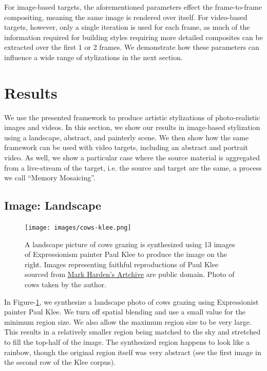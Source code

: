 \documentclass[a4paper,10pt,final]{ThesisStyle}
\begin{document}
For image-based targets, the aforementioned parameters effect the frame-to-frame compositing, meaning the same image is rendered over itself.  For video-based targets, however, only a single iteration is used for each frame, as much of the information required for building styles requiring more detailed composites can be extracted over the first 1 or 2 frames.  We demonstrate how these parameters can influence a wide range of stylizations in the next section.
\section{Results}  
\label{sec:results}
We use the presented framework to produce artistic stylizations of photo-realistic images and videos.  In this section, we show our results in image-based stylization using a landscape, abstract, and painterly scene. We then show how the same framework can be used with video targets, including an abstract and portrait video.  As well, we show a particular case where the source material is aggregated from a live-stream of the target, i.e. the source and target are the same, a process we call ``Memory Mosaicing''.  

\subsection{Image: Landscape}\vspace{-0.4em}
\begin{figure}[ht]
  \centering
  \texttt{[image: images/cows-klee.png]}
  \caption{A landscape picture of cows grazing is synthesized using 13 images of Expressionism painter Paul Klee to produce the image on the right.  Images representing faithful reproductions of Paul Klee sourced from \href{http://www.artchive.com/}{Mark Harden's Artchive} are public domain. Photo of cows taken by the author.}
  \label{fig:cows-klee}
\end{figure}
In Figure-\ref{fig:cows-klee}, we synthesize a landscape photo of cows grazing using Expressionist painter Paul Klee.  We turn off spatial blending and use a small value for the minimum region size.  We also allow the maximum region size to be very large.  This results in a relatively smaller region being matched to the sky and stretched to fill the top-half of the image.  The synthesized region happens to look like a rainbow, though the original region itself was very abstract (see the first image in the second row of the Klee corpus).  
\end{document}
